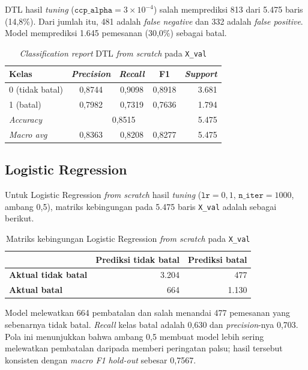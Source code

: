 DTL hasil \textit{tuning} ($\texttt{ccp\_alpha}=3\times10^{-4}$) salah
memprediksi 813 dari 5.475 baris (14,8\%). Dari jumlah itu, 481 adalah
\textit{false negative} dan 332 adalah \textit{false positive}. Model
memprediksi 1.645 pemesanan (30,0\%) sebagai batal.

\begin{table}[H]
	\centering
	\caption{\textit{Classification report} DTL \textit{from scratch} pada \texttt{X\_val}}
	\label{tab:report-dtl}
	\begin{tabular}{l c c c r}
		\toprule
		\textbf{Kelas} & \textbf{\textit{Precision}} & \textbf{\textit{Recall}} & \textbf{F1} & \textbf{\textit{Support}} \\
		\midrule
		0 (tidak batal) & 0,8744 & 0,9098 & 0,8918 & 3.681 \\
		1 (batal)       & 0,7982 & 0,7319 & 0,7636 & 1.794 \\
		\midrule
		\textit{Accuracy}  & \multicolumn{3}{c}{0,8515} & 5.475 \\
		\textit{Macro avg} & 0,8363 & 0,8208 & 0,8277 & 5.475 \\
		\bottomrule
	\end{tabular}
\end{table}

\subsection{Logistic Regression}

Untuk Logistic Regression \textit{from scratch} hasil \textit{tuning}
($\texttt{lr}=0{,}1$, $\texttt{n\_iter}=1000$, ambang 0,5), matriks kebingungan
pada 5.475 baris \texttt{X\_val} adalah sebagai berikut.

\begin{table}[H]
\centering
\caption{Matriks kebingungan Logistic Regression \textit{from scratch} pada \texttt{X\_val}}
\label{tab:cm-lr}
\begin{tabular}{l r r}
\toprule
 & \textbf{Prediksi tidak batal} & \textbf{Prediksi batal} \\
\midrule
\textbf{Aktual tidak batal} & 3.204 & 477 \\
\textbf{Aktual batal} & 664 & 1.130 \\
\bottomrule
\end{tabular}
\end{table}

Model melewatkan 664 pembatalan dan salah menandai 477 pemesanan yang sebenarnya
tidak batal. \textit{Recall} kelas batal adalah 0,630 dan \textit{precision}-nya
0,703. Pola ini menunjukkan bahwa ambang 0,5 membuat model lebih sering melewatkan
pembatalan daripada memberi peringatan palsu; hasil tersebut konsisten dengan
\textit{macro F1} \textit{hold-out} sebesar 0,7567.


